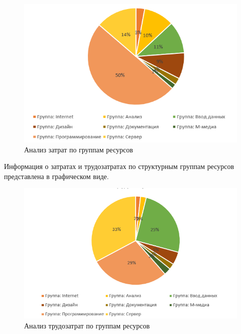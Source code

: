 \begin{figure}[h!]
	\begin{center}
		\includegraphics[scale=0.92]{inc/img/p_7.png}
	\end{center}
	\captionsetup{justification=centering}
	\caption{Анализ затрат по группам ресурсов}
	\label{fig:u3}
\end{figure}

Информация о затратах и трудозатратах по структурным группам ресурсов
представлена в графическом виде.

\begin{figure}[h!]
	\begin{center}
		\includegraphics[scale=0.92]{inc/img/p_9.jpg}
	\end{center}
	\captionsetup{justification=centering}
	\caption{Анализ трудозатрат по группам ресурсов}
	\label{fig:u15}
\end{figure}

\clearpage

